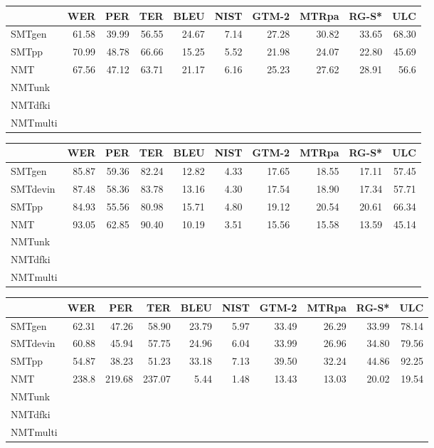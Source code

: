 \documentclass[a4paper,11pt]{article}
\begin{document}
\begin{table}[t]
\small

\begin{tabular}{lrrrrrrrrr}
\toprule
         & WER   &  PER  & TER   &  BLEU & NIST & GTM-2 & MTRpa & RG-S* & ULC \\
\midrule
SMTgen	 & 61.58 & 39.99 & 56.55 & 24.67 & 7.14 & 27.28 & 30.82 & 33.65 & 68.30 \\  
SMTpp	 & 70.99 & 48.78 & 66.66 & 15.25 & 5.52 & 21.98 & 24.07 & 22.80 & 45.69 \\  
NMT	 & 67.56 & 47.12 & 63.71 & 21.17 & 6.16 & 25.23 & 27.62 & 28.91 & 56.6 \\  
NMTunk  \\
NMTdfki \\
NMTmulti \\
\bottomrule
\end{tabular}

\begin{tabular}{lrrrrrrrrr}
\toprule
         & WER   &  PER  & TER   &  BLEU & NIST & GTM-2 & MTRpa & RG-S* & ULC \\
\midrule

SMTgen	 & 85.87 & 59.36 & 82.24 & 12.82 & 4.33 & 17.65 & 18.55 & 17.11 & 57.45 \\  
SMTdevin & 87.48 & 58.36 & 83.78 & 13.16 & 4.30 & 17.54 & 18.90 & 17.34 & 57.71 \\  
SMTpp	 & 84.93 & 55.56 & 80.98 & 15.71 & 4.80 & 19.12 & 20.54 & 20.61 & 66.34 \\  
NMT	 & 93.05 & 62.85 & 90.40 & 10.19 & 3.51 & 15.56 & 15.58 & 13.59 & 45.14 \\  
NMTunk  \\
NMTdfki \\
NMTmulti \\
\bottomrule
\end{tabular}


\begin{tabular}{lrrrrrrrrr}
\toprule
         & WER   &  PER  & TER   &  BLEU & NIST & GTM-2 & MTRpa & RG-S* & ULC \\
\midrule
SMTgen   & 62.31 & 47.26 & 58.90 & 23.79 & 5.97 & 33.49 & 26.29 & 33.99 & 78.14 \\  
SMTdevin & 60.88 & 45.94 & 57.75 & 24.96 & 6.04 & 33.99 & 26.96 & 34.80 & 79.56 \\  
SMTpp	 & 54.87 & 38.23 & 51.23 & 33.18 & 7.13 & 39.50 & 32.24 & 44.86 & 92.25 \\  
NMT      & 238.8 & 219.68 & 237.07 & 5.44 & 1.48 & 13.43 & 13.03 & 20.02 & 19.54 \\  
NMTunk  \\
NMTdfki \\
NMTmulti \\
\bottomrule
\end{tabular}


\end{table}
\end{document}
